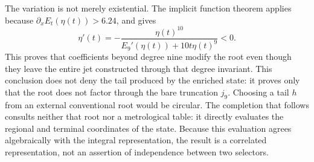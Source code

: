 The variation is not merely existential. The implicit function theorem
applies because \(\partial_xE_t(\eta(t))>6.24\), and gives
\begin{equation}
 \eta'(t)=-
 \frac{\eta(t)^{10}}
 {E_9'(\eta(t))+10t\eta(t)^9}<0.
 \label{eq:alpha-variacion-raiz-prolongacion}
\end{equation}
This proves that coefficients beyond degree nine modify the root even though
they leave the entire jet constructed through that degree invariant. This
conclusion does not deny the tail produced by the enriched state: it proves
only that the root does not factor through the bare truncation \(j_9\).
Choosing a tail \(h\) from an external conventional root would be circular.
The completion that follows consults neither that root nor a metrological
table: it directly evaluates the regional and terminal coordinates of the
state. Because this evaluation agrees algebraically with the integral
representation, the result is a correlated representation, not an assertion of
independence between two selectors.


\endinput

\subsubsection{Complete reader, naturality, and common cylinders}

Let \(F_{\mathsf s}\) be the coefficient field of the signature of
\(\mathsf s\in\mathcal X_\alpha^{\mathrm{enr}}\), and let \(d_m=6+3m\).
Define
\[
 \mathfrak J_m:=\coprod_{\mathsf s\in\mathcal X_\alpha^{\mathrm{enr}}}
 \{\mathsf s\}\times F_{\mathsf s}[X]/(X^{d_m+1}),\qquad
 \Gamma_m(\mathsf s)=
 \bigl(\mathsf s,E_{21/22}^{(d_m)}(\mathsf s;X)\bigr).
\]
The registered complete reader \(\Gamma_{E21}\) produces these representations.
For \(m'\ge m\), the truncation
\(
 \tau_{m',m}(\mathsf s,[f]_{d_{m'}})
 =(\mathsf s,[f]_{d_m})
\)
satisfies
\begin{equation}
 \tau_{m',m}\circ\Gamma_{m'}=\Gamma_m,
 \qquad
 E_{21/22}:=\varprojlim_mE_{21/22}^{(d_m)}.
 \tag{A3}
 \label{eq:alpha-sistema-analitico-completo}
\end{equation}
No section of the bare truncation is added. If the representation of the next
three coefficients is made explicit, it is the derived projection
\[
 \Lambda_{d_m+1:d_m+3}
 :=\operatorname{pr}_{d_m+1:d_m+3}\circ
   \Gamma_{E21}\circ\mathcal U_{\mathrm{TPK}},
\]
not an independent generator or a readout of the target value.

